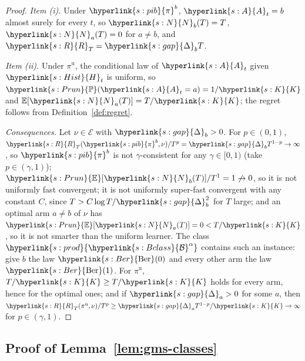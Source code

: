 \documentclass[11pt]{article}
\newcommand{\E}{\mathbb{E}}
\newcommand{\Prob}{\mathbb{P}}
\newcommand{\sy}[2]{{\hyperlink{#1}{#2}}}
\newcommand{\Ber}{\sy{s:Ber}{\mathrm{Ber}}}
\newcommand{\Bclass}{\sy{s:Bclass}{\mathcal{B}}}
\newcommand{\Karms}{\sy{s:K}{K}}
\newcommand{\gap}{\sy{s:gap}{\Delta}}
\newcommand{\powc}[1]{\sy{s:prod}{#1^{\alpha}}}
\newcommand{\Hist}{\sy{s:Hist}{H}}
\newcommand{\Ap}{\sy{s:A}{A}}
\newcommand{\Pru}{\sy{s:Prun}{\Prob}}
\newcommand{\Er}{\sy{s:Prun}{\E}}
\newcommand{\Np}{\sy{s:N}{N}}
\newcommand{\Reg}{\sy{s:R}{R}}
\newcommand{\Cons}{\sy{s:pib}{\pi}}
\begin{document}
\begin{proof}
\emph{Item (i).} Under $\Cons^b$, $\Ap_t=b$ almost surely for every $t$, so $\Np_b(T)=T$, $\Np_a(T)=0$
for $a\ne b$, and $\Reg_T=\gap_bT$.

\emph{Item (ii).} Under $\pi^{\mathrm{u}}$, the conditional law of $\Ap_t$ given $\Hist_t$ is uniform,
so $\Pru(\Ap_t=a)=1/\Karms$ and $\E[\Np_a(T)]=T/\Karms$; the regret follows from
Definition~\ref{def:regret}.

\emph{Consequences.} Let $\nu\in\mathcal E$ with $\gap_b>0$. For $p\in(0,1)$, $\Reg_T(\Cons^b,\nu)/T^p=
\gap_bT^{1-p}\to\infty$, so $\Cons^b$ is not $\gamma$-consistent for any $\gamma\in[0,1)$ (take
$p\in(\gamma,1)$); $\Er[\Np_b(T)]/T^{1}=1\not\to0$, so it is not uniformly fast convergent; it is
not uniformly super-fast convergent with any constant $C$, since $T>C\log T/\gap_b^2$ for $T$ large;
and an optimal arm $a\ne b$ of $\nu$ has $\Er[\Np_a(T)]=0<T/\Karms$, so it is not smarter than the
uniform learner. The class $\powc{\Bclass}$ contains such an instance: give $b$ the law $\Ber(0)$ and
every other arm the law $\Ber(1)$. For $\pi^{\mathrm{u}}$, $T/\Karms\ge T/\Karms$ holds for every arm,
hence for the optimal ones; and if $\gap_a>0$ for some $a$, then $\Reg_T(\pi^{\mathrm{u}},\nu)/T^p\ge
\gap_aT^{1-p}/\Karms\to\infty$ for $p\in(\gamma,1)$.
\end{proof}

\subsection{Proof of Lemma~\ref{lem:gms-classes}}\label{sec:proof-gms-classes}
\end{document}
